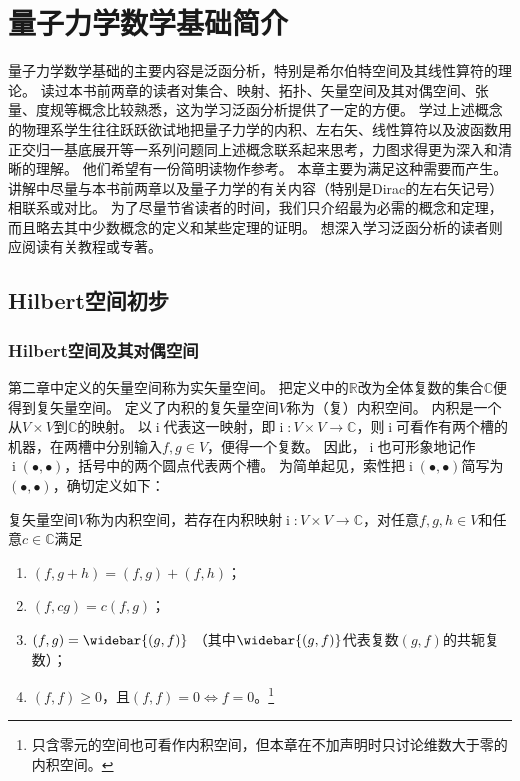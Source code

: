 \chapter{量子力学数学基础简介}

量子力学数学基础的主要内容是泛函分析，特别是希尔伯特空间及其线性算符的理论。
读过本书前两章的读者对集合、映射、拓扑、矢量空间及其对偶空间、张量、度规等概念比较熟悉，这为学习泛函分析提供了一定的方便。
学过上述概念的物理系学生往往跃跃欲试地把量子力学的内积、左右矢、线性算符以及波函数用正交归一基底展开等一系列问题同上述概念联系起来思考，力图求得更为深入和清晰的理解。
他们希望有一份简明读物作参考。
本章主要为满足这种需要而产生。
讲解中尽量与本书前两章以及量子力学的有关内容（特别是Dirac的左右矢记号）相联系或对比。
为了尽量节省读者的时间，我们只介绍最为必需的概念和定理，而且略去其中少数概念的定义和某些定理的证明。
想深入学习泛函分析的读者则应阅读有关教程或专著。

\section{Hilbert空间初步}

\subsection{Hilbert空间及其对偶空间}

第二章中定义的矢量空间称为实矢量空间。
把定义中的$\mathbb{R}$改为全体复数的集合$\mathbb{C}$便得到复矢量空间。
定义了内积的复矢量空间$V$称为（复）内积空间。
内积是一个从$V \times V$到$\mathbb{C}$的映射。
以$\operatorname{i}$代表这一映射，即$\operatorname{i} \colon V \times V \to \mathbb{C}$，则$\operatorname{i}$可看作有两个槽的机器，在两槽中分别输入$f, g \in V$，便得一个复数。
因此，$\operatorname{i}$也可形象地记作$\operatorname{i}(\bullet,\bullet)$，括号中的两个圆点代表两个槽。
为简单起见，索性把$\operatorname{i}(\bullet,\bullet)$简写为$(\bullet,\bullet)$，确切定义如下：

\begin{definition}
    复矢量空间$V$称为内积空间，若存在内积映射$\operatorname{i} \colon V \times V \to \mathbb{C}$，对任意$f, g, h \in V$和任意$c \in \mathbb{C}$满足
    \begin{enumerate}[（a）]
        \item $(f, g + h) = (f, g) + (f, h)$；
        \item $(f, cg) = c(f, g)$；
        \item $(f, g) = \widebar{(g, f)}$ （其中$\widebar{(g, f)}$代表复数$(g, f)$的共轭复数）；
        \item $(f, f) \geq 0$，且$(f, f) = 0 \Leftrightarrow f = 0$。\footnote{
            只含零元的空间也可看作内积空间，但本章在不加声明时只讨论维数大于零的内积空间。
        }
    \end{enumerate}
\end{definition}

